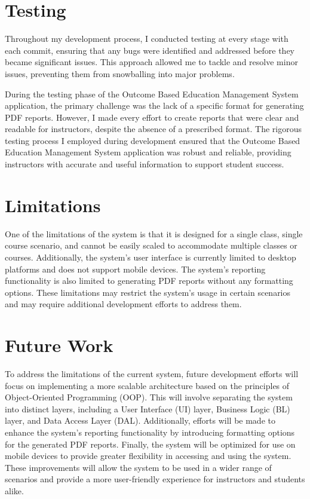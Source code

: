 \documentclass[12pt,a4paper]{article}
\begin{document}
\section{Testing}
Throughout my development process, I conducted testing at every stage with each commit, ensuring that any bugs were identified and addressed before they became significant issues. This approach allowed me to tackle and resolve minor issues, preventing them from snowballing into major problems.

During the testing phase of the Outcome Based Education Management System application, the primary challenge was the lack of a specific format for generating PDF reports. However, I made every effort to create reports that were clear and readable for instructors, despite the absence of a prescribed format. The rigorous testing process I employed during development ensured that the  Outcome Based Education Management System application was robust and reliable, providing instructors with accurate and useful information to support student success.

\section{Limitations}
One of the limitations of the system is that it is designed for a single class, single course scenario, and cannot be easily scaled to accommodate multiple classes or courses. Additionally, the system's user interface is currently limited to desktop platforms and does not support mobile devices. The system's reporting functionality is also limited to generating PDF reports without any formatting options. These limitations may restrict the system's usage in certain scenarios and may require additional development efforts to address them.
\section{Future Work}
To address the limitations of the current system, future development efforts will focus on implementing a more scalable architecture based on the principles of Object-Oriented Programming (OOP). This will involve separating the system into distinct layers, including a User Interface (UI) layer, Business Logic (BL) layer, and Data Access Layer (DAL). Additionally, efforts will be made to enhance the system's reporting functionality by introducing formatting options for the generated PDF reports. Finally, the system will be optimized for use on mobile devices to provide greater flexibility in accessing and using the system. These improvements will allow the system to be used in a wider range of scenarios and provide a more user-friendly experience for instructors and students alike.
\end{document}
